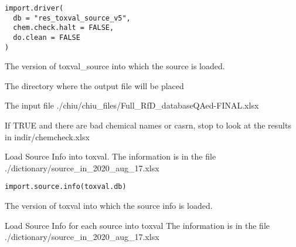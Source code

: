 \documentclass[letterpaper]{book}
\begin{document}
%
\begin{Usage}
\begin{verbatim}
import.driver(
  db = "res_toxval_source_v5",
  chem.check.halt = FALSE,
  do.clean = FALSE
)
\end{verbatim}
\end{Usage}
%
\begin{Arguments}
\begin{ldescription}
\item[\code{db}] The version of toxval\_source into which the source is loaded.

\item[\code{indir}] The directory where the output file will be placed

\item[\code{infile}] The input file ./chiu/chiu\_files/Full\_RfD\_databaseQAed-FINAL.xlsx

\item[\code{chem.chek.halt}] If TRUE and there are bad chemical names or casrn,
stop to look at the results in indir/chemcheck.xlsx
\end{ldescription}
\end{Arguments}
%
\begin{Description}\relax
Load Source Info into toxval. 
The information is in the file ./dictionary/source\_in\_2020\_aug\_17.xlsx
\end{Description}
%
\begin{Usage}
\begin{verbatim}
import.source.info(toxval.db)
\end{verbatim}
\end{Usage}
%
\begin{Arguments}
\begin{ldescription}
\item[\code{toxval.db}] The version of toxval into which the source info is loaded.
\end{ldescription}
\end{Arguments}
%
\begin{Description}\relax
Load Source Info for each source into toxval
The information is in the file ./dictionary/source\_in\_2020\_aug\_17.xlsx
\end{Description}
\end{document}
